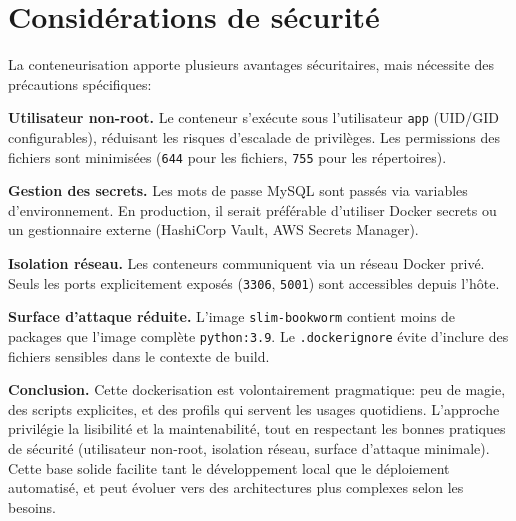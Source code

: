 \section{Considérations de sécurité}

La conteneurisation apporte plusieurs avantages sécuritaires, mais nécessite des précautions spécifiques:

\textbf{Utilisateur non-root.} Le conteneur s'exécute sous l'utilisateur \texttt{app} (UID/GID configurables), réduisant les risques d'escalade de privilèges. Les permissions des fichiers sont minimisées (\texttt{644} pour les fichiers, \texttt{755} pour les répertoires).

\textbf{Gestion des secrets.} Les mots de passe MySQL sont passés via variables d'environnement. En production, il serait préférable d'utiliser Docker secrets ou un gestionnaire externe (HashiCorp Vault, AWS Secrets Manager).

\textbf{Isolation réseau.} Les conteneurs communiquent via un réseau Docker privé. Seuls les ports explicitement exposés (\texttt{3306}, \texttt{5001}) sont accessibles depuis l'hôte.

\textbf{Surface d'attaque réduite.} L'image \texttt{slim-bookworm} contient moins de packages que l'image complète \texttt{python:3.9}. Le \texttt{.dockerignore} évite d'inclure des fichiers sensibles dans le contexte de build.




\noindent\textbf{Conclusion.} Cette dockerisation est volontairement pragmatique: peu de magie, des scripts explicites, et des profils qui servent les usages quotidiens. L'approche privilégie la lisibilité et la maintenabilité, tout en respectant les bonnes pratiques de sécurité (utilisateur non-root, isolation réseau, surface d'attaque minimale). Cette base solide facilite tant le développement local que le déploiement automatisé, et peut évoluer vers des architectures plus complexes selon les besoins.
